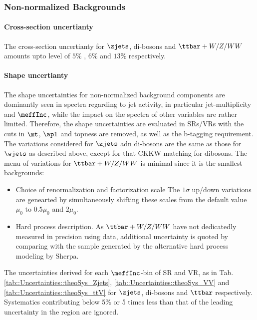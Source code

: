 



\clearpage
\subsubsection{Non-normalized Backgrounds}  
\paragraph{Cross-section uncertianty}
The cross-section uncertianty for $\zjets$, di-bosons and $\ttbar+W/Z/WW$ amounts upto level of $5\%$ \cite{VjetsXsecMeas_ATLAS_Run1}, $6\%$ \cite{BosonXsec_calc_ATLAS} and $13\%$ \cite{Alwall:2014hca} respectively. 

\paragraph{Shape uncertianty}
The shape uncertainties for non-normalized background components are dominantly seen in spectra regarding to jet activity, in particular jet-multiplicity and $\meffInc$, while the impact on the spectra of other variables are rather limited. Therefore, the shape uncertainties are evaluated in SRs/VRs with the cuts in $\mt$, $\apl$ and topness are removed, as well as the b-tagging requirement. \\


The variations considered for $\zjets$ adn di-bosons are the same as those for $\wjets$ as described above, except for that CKKW matching for dibosons. The menu of variations for $\ttbar+W/Z/WW$ is minimal since it is the smallest backgrounds:
\begin{itemize}
\item Choice of renormalization and factorization scale
The $1\sigma$ up/down variations are genearted by simultaneously shifting these scales from the default value $\mu_0$ to $0.5\mu_0$ and $2\mu_0$.
\item Hard process description.
As $\ttbar+W/Z/WW$ have not dedicatedly measured in precision using data, additional uncertainty is quoted by comparing with the sample generated by the alternative hard process modeling by Sherpa.
\end{itemize}

The uncertainties derived for each $\meffInc$-bin of SR and VR, as in Tab. \ref{tab::Uncertainties::theoSys_Zjets}, \ref{tab::Uncertainties::theoSys_VV} and \ref{tab::Uncertainties::theoSys_ttV} for $\zjets$, di-bosons and $\ttbar$ respectively. Systematics contributing below 5$\%$ or 5 times less than that of the leading uncertainty in the region are ignored.  \\

